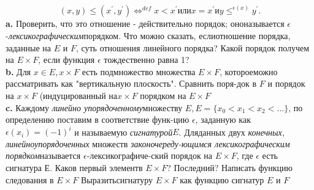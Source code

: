 \begin{equation*}
\left({x,y}\right)\leq{\left({x^{\prime},y^{\prime}}\right)} \Leftrightarrow^{def} x<x^{\prime} \text{или} x=x^{\prime} и y\leq^{\epsilon\left({x}\right)}y^{\prime}.
\end{equation*}
\hspace*{15pt}\textbf{ a.} Проверить, что это отношение - действительно порядок; оно\linebreak называется $\epsilon$-\textit{лексикографическим}порядком. Что можно сказать, если\linebreak отношение порядка, заданные на $E$ и $F$, суть отношения линейного порядка? Какой порядок получем на $E\times{F}$, если функция $\epsilon$ тождественно равна 1?\newline
\\
\hspace*{15pt}\textbf{ b.} Для $x\in{E}, x\times{F}$ есть подмножество множества $E\times{F}$, которое\linebreak можно рассматривать как "вертикальную плоскость". Сравнить поря-\linebreak док в $F$ и порядок на $x\times{F}$ (индуцированный на\linebreak $x\times{F}$ порядком на $E\times{F}$\newline
\\
\hspace*{15pt}\textbf{c.} Каждому \textit{линейно упорядоченному}множеству $E,E=$\linebreak$\{{x_{0}<x_{1}<x_{2}<\dots}\}$, по определению поставим в соответствие функ-\linebreak цию $\epsilon$, заданную как 
 $\epsilon\left({x_{i}}\right)=\left(-1\right)^{i}$ и называемую \textit{сигнатурой}$E$. Для\linebreak данных двух \textit{конечных, линейноупорядоченных} множеств \textit{законочереду-\linebreak ющимся лексикографическим порядком}называется $\epsilon$-лексикографиче-\linebreak ский порядок на $E\times{F}$, где $\epsilon$ есть сигнатура $Е$. Каков первый элемент\linebreak в $E\times{F}$? Последний? Написать функцию следования в $E\times{F}$ Выразить\linebreak сигнатуру $E\times{F}$ как функцию сигнатур $E$ и $F$
\newpage
%

  
